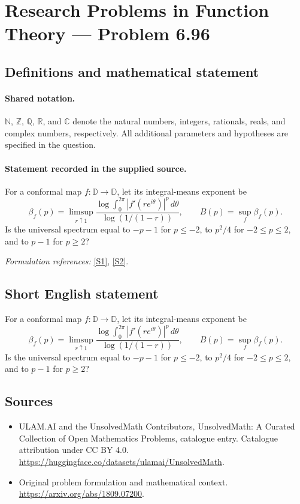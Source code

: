 \documentclass[11pt]{article}
\newcommand{\sref}[2]{\hyperlink{source:#1:#2}{[S#2]}}
\begin{document}
\section{Research Problems in Function Theory — Problem 6.96}\label{statement}

\subsection{Definitions and mathematical statement}

\paragraph{Shared notation.}$\mathbb N$, $\mathbb Z$, $\mathbb Q$, $\mathbb R$, and $\mathbb C$ denote the natural numbers, integers, rationals, reals, and complex numbers, respectively. All additional parameters and hypotheses are specified in the question.


\paragraph{Statement recorded in the supplied source.}
For a conformal map $f:\mathbb D\to\mathbb D$, let its integral-means exponent be
\[\beta_f(p)=\limsup_{r\uparrow1}\frac{\log\int_0^{2\pi}|f'(re^{i\theta})|^p\,d\theta}{\log(1/(1-r))},\qquad B(p)=\sup_f\beta_f(p).\]
Is the universal spectrum equal to $-p-1$ for $p\leq-2$, to $p^2/4$ for $-2\leq p\leq2$, and to $p-1$ for $p\geq2$?
\par\smallskip\textit{Formulation references:} \sref{statement}{1}, \sref{statement}{2}.
\subsection{Short English statement}
For a conformal map $f:\mathbb D\to\mathbb D$, let its integral-means exponent be
\[\beta_f(p)=\limsup_{r\uparrow1}\frac{\log\int_0^{2\pi}|f'(re^{i\theta})|^p\,d\theta}{\log(1/(1-r))},\qquad B(p)=\sup_f\beta_f(p).\]
Is the universal spectrum equal to $-p-1$ for $p\leq-2$, to $p^2/4$ for $-2\leq p\leq2$, and to $p-1$ for $p\geq2$?
\subsection{Sources}
\begin{itemize}
\item[\hypertarget{source:statement:1}{S1}] ULAM.AI and the UnsolvedMath Contributors, UnsolvedMath: A Curated Collection of Open Mathematics Problems, catalogue entry. Catalogue attribution under CC BY 4.0.
\url{https://huggingface.co/datasets/ulamai/UnsolvedMath}.
\item[\hypertarget{source:statement:2}{S2}] Original problem formulation and mathematical context.
\url{https://arxiv.org/abs/1809.07200}.
\end{itemize}
\label{end:statement}
\end{document}
